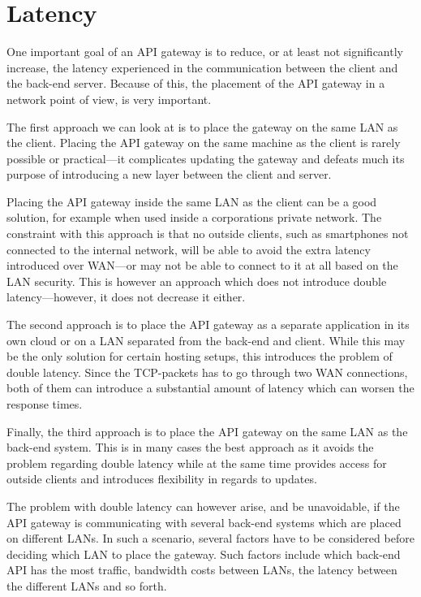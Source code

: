 \documentclass{cslthse-msc}
\begin{document}
\section{Latency}
One important goal of an API gateway is to reduce, or at least not significantly increase, the latency experienced in the communication between the client and the back-end server. Because of this, the placement of the API gateway in a network point of view, is very important. 

The first approach we can look at is to place the gateway on the same LAN as the client. Placing the API gateway on the same machine as the client is rarely possible or practical---it complicates updating the gateway and defeats much its purpose of introducing a new layer between the client and server. 

Placing the API gateway inside the same LAN as the client can be a good solution, for example when used inside a corporations private network. The constraint with this approach is that no outside clients, such as smartphones not connected to the internal network, will be able to avoid the extra latency introduced over WAN---or may not be able to connect to it at all based on the LAN security. This is however an approach which does not introduce double latency---however, it does not decrease it either.

The second approach is to place the API gateway as a separate application in its own cloud or on a LAN separated from the back-end and client. While this may be the only solution for certain hosting setups, this introduces the problem of double latency. Since the TCP-packets has to go through two WAN connections, both of them can introduce a substantial amount of latency which can worsen the response times.

Finally, the third approach is to place the API gateway on the same LAN as the back-end system. This is in many cases the best approach as it avoids the problem regarding double latency while at the same time provides access for outside clients and introduces flexibility in regards to updates. 

The problem with double latency can however arise, and be unavoidable, if the API gateway is communicating with several back-end systems which are placed on different LANs. In such a scenario, several factors have to be considered before deciding which LAN to place the gateway. Such factors include which back-end API has the most traffic, bandwidth costs between LANs, the latency between the different LANs and so forth.
\end{document}
